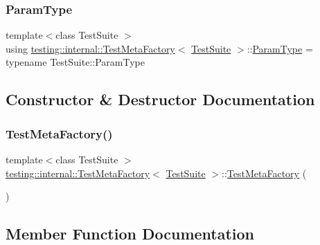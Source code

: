 \subsubsection{\texorpdfstring{Param\+Type}{ParamType}}
{\footnotesize\ttfamily template$<$class Test\+Suite $>$ \\
using \hyperlink{classtesting_1_1internal_1_1TestMetaFactory}{testing\+::internal\+::\+Test\+Meta\+Factory}$<$ \hyperlink{classtesting_1_1TestSuite}{Test\+Suite} $>$\+::\hyperlink{classtesting_1_1internal_1_1TestMetaFactory_a392ebab15dfdcfa1b54bbe15878aa9cd}{Param\+Type} =  typename Test\+Suite\+::\+Param\+Type}



\subsection{Constructor \& Destructor Documentation}
\mbox{\label{classtesting_1_1internal_1_1TestMetaFactory_a1a48d63fbff650741c8f718af5c373d2}} 
\subsubsection{\texorpdfstring{Test\+Meta\+Factory()}{TestMetaFactory()}}
{\footnotesize\ttfamily template$<$class Test\+Suite $>$ \\
\hyperlink{classtesting_1_1internal_1_1TestMetaFactory}{testing\+::internal\+::\+Test\+Meta\+Factory}$<$ \hyperlink{classtesting_1_1TestSuite}{Test\+Suite} $>$\+::\hyperlink{classtesting_1_1internal_1_1TestMetaFactory}{Test\+Meta\+Factory} (\begin{DoxyParamCaption}{ }\end{DoxyParamCaption})\hspace{0.3cm}{\ttfamily [inline]}}



\subsection{Member Function Documentation}
\mbox{\label{classtesting_1_1internal_1_1TestMetaFactory_abd5d30fab71229deb5e63f5bb5ea3fd8}} 
